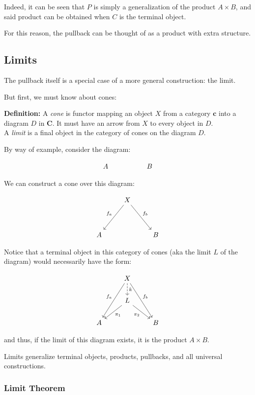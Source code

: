 \documentclass[]{article}
\newcommand{\what}{}
\newcommand{\cat}[1]{\mathbf{#1}}
\newcommand{\defn}[2]{
\renewcommand{\what}{\textit{#1} }
\textbf{Definition:} #2\\
}
\begin{document}
Indeed, it can be seen that $P$ is simply a generalization of the product $A \times B$, and said product can be obtained when $C$ is the terminal object.

For this reason, the pullback can be thought of as a product with extra structure.

\subsection{Limits}

The pullback itself is a special case of a more general construction: the limit.

But first, we must know about cones:

\defn{cone}{A \what is functor mapping an object $X$ from a category $\cat{c}$ into a diagram $D$ in $\cat{C}$. It must have an arrow from $X$ to every object in $D$.}

A \textit{limit} is a final object in the category of cones on the diagram $D$.

By way of example, consider the diagram:

$$\begin{tikzcd}
A & & B
\end{tikzcd}$$

We can construct a cone over this diagram:

$$\begin{tikzcd}
{} & X \arrow[swap]{ddl}{f_a} \arrow{ddr}{f_b} & \\
  & & \\
A & & B
\end{tikzcd}$$

Notice that a terminal object in this category of cones (aka the limit $L$ of the diagram) would necessarily have the form:

$$\begin{tikzcd}
{} & X \arrow[swap]{ddl}{f_a} \arrow{ddr}{f_b} \arrow[dashed]{d}{k} & \\
  & L \arrow{dl}{\pi_1} \arrow[swap]{dr}{\pi_2} & \\
A & & B
\end{tikzcd}$$

and thus, if the limit of this diagram exists, it is the product $A\times B$.

Limits generalize terminal objects, products, pullbacks, and all universal constructions.

\subsubsection{Limit Theorem}
\end{document}
